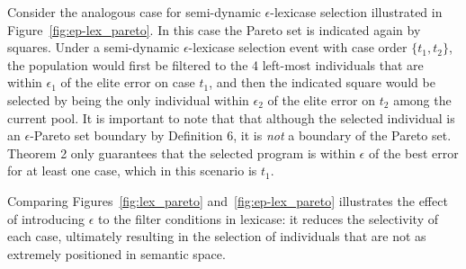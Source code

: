 \documentclass[preprint]{article}
\begin{document}
Consider the analogous case for semi-dynamic $\epsilon$-lexicase selection illustrated in Figure~\ref{fig:ep-lex_pareto}. In this case the Pareto set is indicated again by squares. Under a semi-dynamic $\epsilon$-lexicase selection event with case order $\{t_1, t_2\}$, the population would first be filtered to the 4 left-most individuals that are within $\epsilon_1$ of the elite error on case $t_1$, and then the indicated square would be selected by being the only individual within $\epsilon_2$ of the elite error on $t_2$ among the current pool. It is important to note that that although the selected individual is an $\epsilon$-Pareto set boundary by Definition 6, it is {\it not} a boundary of the Pareto set. Theorem 2 only guarantees that the selected program is within $\epsilon$ of the best error for at least one case, which in this scenario is $t_1$. 

Comparing Figures~\ref{fig:lex_pareto} and~\ref{fig:ep-lex_pareto} illustrates the effect of introducing $\epsilon$ to the filter conditions in lexicase: it reduces the selectivity of each case, ultimately resulting in the selection of individuals that are not as extremely positioned in semantic space. 
\end{document}
